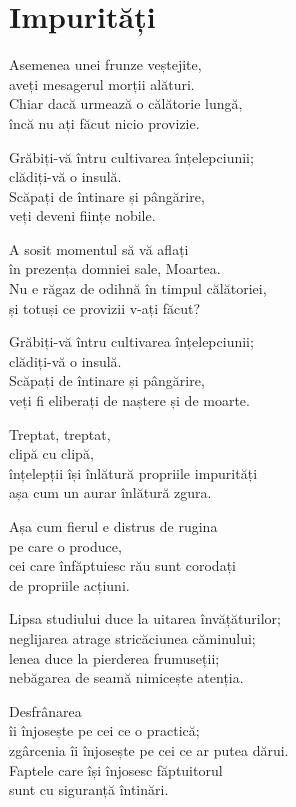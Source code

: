 
\chapter{Impurități}


Asemenea unei frunze veștejite,\\
aveți mesagerul morții alături.\\
Chiar dacă urmează o călătorie lungă,\\
încă nu ați făcut nicio provizie.


Grăbiți-vă întru cultivarea înțelepciunii;\\
clădiți-vă o insulă.\\
Scăpați de întinare și pângărire,\\
veți deveni ființe nobile.


A sosit momentul să vă aflați\\
în prezența domniei sale, Moartea.\\
Nu e răgaz de odihnă în timpul călătoriei,\\
și totuși ce provizii v-ați făcut?


Grăbiți-vă întru cultivarea înțelepciunii;\\
clădiți-vă o insulă.\\
Scăpați de întinare și pângărire,\\
veți fi eliberați de naștere și de moarte.


Treptat, treptat,\\
clipă cu clipă,\\
înțelepții își înlătură propriile impurități\\
așa cum un aurar înlătură zgura.


Așa cum fierul e distrus de rugina\\
pe care o produce,\\
cei care înfăptuiesc rău sunt corodați\\
de propriile acțiuni.


Lipsa studiului duce la uitarea învățăturilor;\\
neglijarea atrage stricăciunea căminului;\\
lenea duce la pierderea frumuseții;\\
nebăgarea de seamă nimicește atenția.


Desfrânarea\\
îi înjosește pe cei ce o practică;\\
zgârcenia îi înjosește pe cei ce ar putea dărui.\\
Faptele care își înjosesc făptuitorul\\
sunt cu siguranță întinări.


